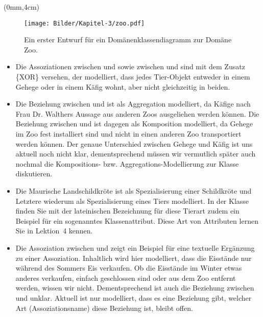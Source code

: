 \null\newpage
\begin{textblock*}{\paperwidth}(0mm,4cm)
	\begin{figure}
		\centering
		\noindent\texttt{[image: Bilder/Kapitel-3/zoo.pdf]}
		\caption{Ein erster Entwurf für ein Domänenklassendiagramm zur Domäne Zoo.}
		\label{fig:entwurf_domaene_zoo}
	\end{figure}
\end{textblock*}
\null\newpage


\begin{itemize}
	\item Die Assoziationen zwischen  und  sowie zwischen  und  sind mit dem Zusatz \{XOR\} versehen, der modelliert, dass jedes Tier-Objekt entweder in einem Gehege oder in einem Käfig wohnt, aber nicht gleichzeitig in beiden.
	\item Die Beziehung zwischen  und  ist als Aggregation modelliert, da Käfige nach Frau Dr. Walthers Aussage aus anderen Zoos ausgeliehen werden können. Die Beziehung zwischen  und  ist dagegen als Komposition modelliert, da Gehege im Zoo fest installiert sind und nicht in einen anderen Zoo transportiert werden können. Der genaue Unterschied zwischen Gehege und Käfig ist uns aktuell noch nicht klar, dementsprechend müssen wir vermutlich später auch nochmal die Kompositions- bzw. Aggregations-Modellierung zur Klasse  diskutieren.
	\item Die Maurische Landschildkröte ist als Spezialisierung einer Schildkröte und Letztere wiederum als Spezialisierung eines Tiers modelliert. In der Klasse \linebreak {} finden Sie mit der lateinischen Bezeichnung für diese Tierart zudem ein Beispiel für ein sogenanntes Klassenattribut. Diese Art von Attributen lernen Sie in Lektion~4 %
	kennen.
	\item Die Assoziation zwischen  und  zeigt ein Beispiel für eine textuelle Ergänzung zu einer Assoziation. Inhaltlich wird hier modelliert, dass die Eisstände nur während des Sommers Eis verkaufen. Ob die Eisstände im Winter etwas anderes verkaufen, einfach geschlossen sind oder aus dem Zoo entfernt werden, wissen wir nicht. Dementsprechend ist auch die Beziehung zwischen  und  unklar. Aktuell ist nur modelliert, dass es eine Beziehung gibt, welcher Art (Assoziationsname) diese Beziehung ist, bleibt offen.

\end{itemize}
